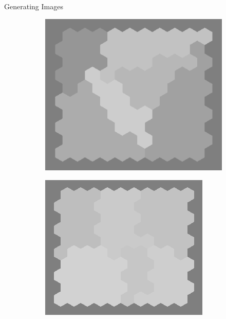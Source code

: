 \documentclass[10pt,xcolor=svgnames]{beamer} %
\begin{document}
\begin{frame}[standout]{Generating Images}
\begin{figure}
\begin{subfigure}{0.4\textwidth}
        \end{subfigure}
        \begin{subfigure}{0.4\textwidth}
        \centering
            \includegraphics[width=\textwidth]{pictures/grid_init3.png}
        \end{subfigure}
        \hfill
        \begin{subfigure}{0.4\textwidth}
        \centering
            \includegraphics[width=\textwidth]{pictures/grid_init4.png}
        \end{subfigure}
    \end{figure}
\end{frame}
\end{document}
